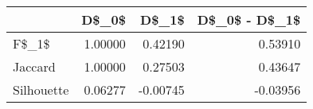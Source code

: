 \begin{table}
\centering
\caption{}
\label{}
\begin{tabular}{lrrr}
\toprule
{} &   D\$\_0\$ &    D\$\_1\$ &  D\$\_0\$ - D\$\_1\$ \\
\midrule
F\$\_1\$      & 1.00000 &  0.42190 &        0.53910 \\
Jaccard    & 1.00000 &  0.27503 &        0.43647 \\
Silhouette & 0.06277 & -0.00745 &       -0.03956 \\
\bottomrule
\end{tabular}
\end{table}
